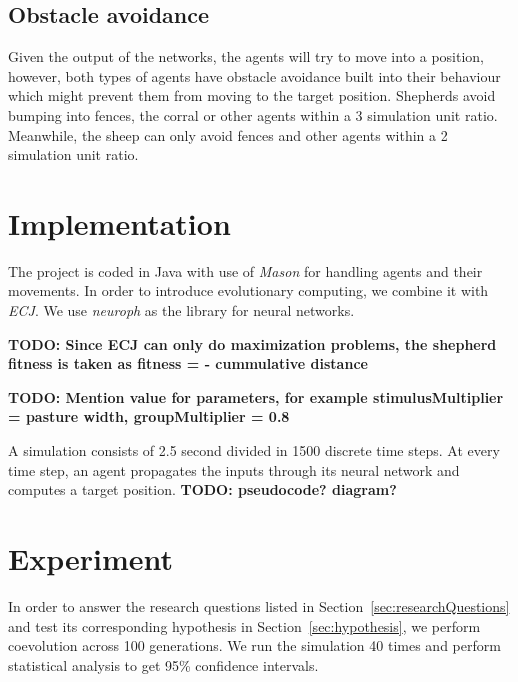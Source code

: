 \documentclass[conference]{IEEEtran}
\begin{document}
\subsection{Obstacle avoidance}
Given the output of the networks, the agents will try to move into a position, however, both types of agents have obstacle avoidance built into their behaviour which might prevent them from moving to the target position. Shepherds avoid bumping into fences, the corral or other agents within a 3 simulation unit ratio. Meanwhile, the sheep can only avoid fences and other agents within a 2 simulation unit ratio. 


\section{Implementation}
The project is coded in Java with use of \textit{Mason} for handling agents and their movements. In order to introduce evolutionary computing, we combine it with \textit{ECJ}. We use \textit{neuroph} as the library for neural networks. 

\textbf{TODO: Since ECJ can only do maximization problems, the shepherd fitness is taken as 
fitness = - cummulative distance}

\textbf{TODO: Mention value for parameters, for example stimulusMultiplier = pasture width, groupMultiplier = 0.8}

A simulation consists of 2.5 second divided in 1500 discrete time steps. At every time step, an agent propagates the inputs through its neural network and computes a target position.
\textbf{TODO: pseudocode? diagram?}
 



\section{Experiment}
\label{sec:experiment}
In order to answer the research questions listed in Section~\ref{sec:researchQuestions} and test its corresponding hypothesis in Section~\ref{sec:hypothesis}, we perform coevolution across 100 generations. 
We run the simulation 40 times and perform statistical analysis to get 95\% confidence intervals.
\end{document}
